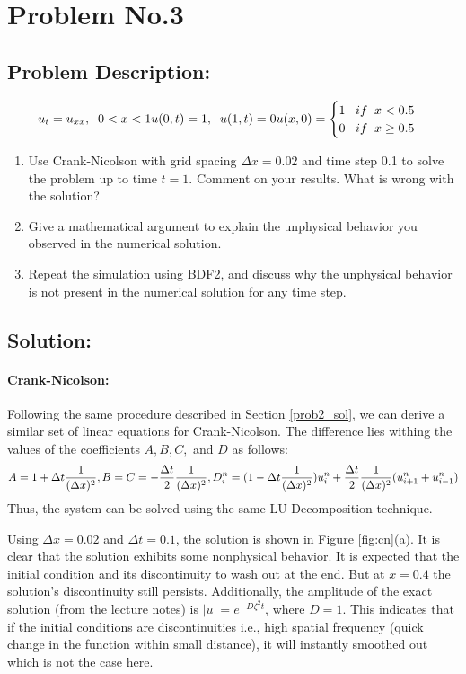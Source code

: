 \section{Problem No.3}
\subsection{Problem Description:}
\[
u_{t} = u_{xx},\;\; 0<x<1\\
u(0,t) =1,\;\; u(1,t)=0\\
u(x,0)=\begin{cases}
         1\;\;\; if \;\;x<0.5\\
         0\;\;\; if\;\; x\geq 0.5
         \end{cases}
\]


\begin{enumerate}
\item Use Crank-Nicolson with grid spacing $\Delta x=0.02$ and time step 0.1 to solve the problem up to time $t=1$. Comment on your results. What is wrong with the solution?
\item Give a mathematical argument to explain the unphysical behavior you observed in the numerical solution.
\item Repeat the simulation using BDF2, and discuss why the unphysical behavior is not present in the numerical solution for any time step. 
\end{enumerate}
\subsection{Solution:}
\paragraph{Crank-Nicolson:}
Following the same procedure described in Section \ref{prob2_sol}, we can derive a similar set of linear equations for Crank-Nicolson. The difference lies withing the values of the coefficients $A,B,C,$ and $D$ as follows:
$$ A = 1+\Delta t \frac{1}{(\Delta x)^{2}},\\
B=C=- \frac{\Delta t}{2}\frac{1}{(\Delta x)^{2}},\\
D_{i}^{n} = (1-\Delta t \frac{1}{(\Delta x)^{2}})u_{i}^{n} + \frac{\Delta t}{2}\frac{1}{(\Delta x)^{2}}(u_{i+1}^{n} +u_{i-1}^{n})$$
Thus, the system can be solved using the same LU-Decomposition technique. 

Using $\Delta x =0.02$ and  $\Delta t = 0.1$, the solution is shown in Figure \ref{fig:cn}(a). It is clear that the solution exhibits some nonphysical behavior. It is expected that the initial condition and its discontinuity to wash out at the end. But at $x=0.4$ the solution's discontinuity still persists. Additionally, the amplitude of the exact solution (from the lecture notes) is $|u|=e^{-D\zeta^{2}t}$, where $D=1$. This indicates that if the initial conditions are discontinuities i.e., high spatial frequency (quick change in the function within small distance), it will instantly smoothed out which is not the case here. 

